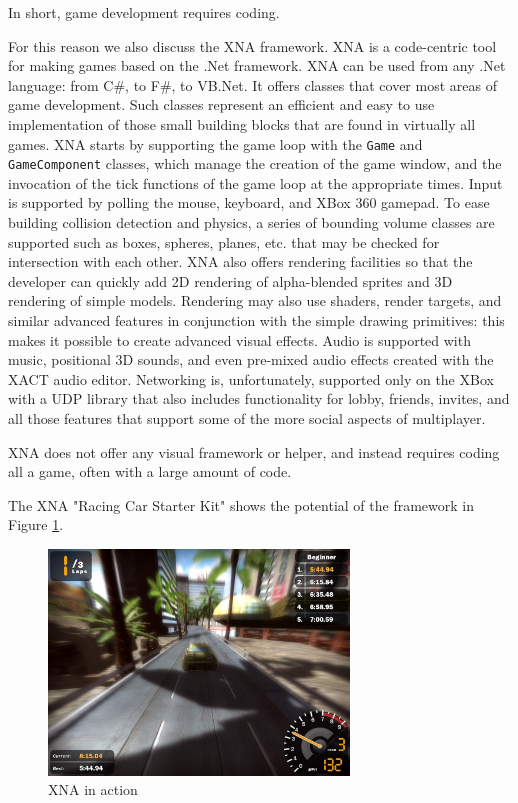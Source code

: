 In short, game development requires coding.

For this reason we also discuss the XNA framework. XNA is a code-centric tool for making games based on the .Net framework. XNA can be used from any .Net language: from C\#, to F\#, to VB.Net. It offers classes that cover most areas of game development. Such classes represent an efficient and easy to use implementation of those small building blocks that are found in virtually all games. XNA starts by supporting the game loop with the \texttt{Game} and \texttt{GameComponent} classes, which manage the creation of the game window, and the invocation of the tick functions of the game loop at the appropriate times. Input is supported by polling the mouse, keyboard, and XBox 360 gamepad. To ease building collision detection and physics, a series of bounding volume classes are supported such as boxes, spheres, planes, etc. that may be checked for intersection with each other. XNA also offers rendering facilities so that the developer can quickly add 2D rendering of alpha-blended sprites and 3D rendering of simple models. Rendering may also use shaders, render targets, and similar advanced features in conjunction with the simple drawing primitives: this makes it possible to create advanced visual effects. Audio is supported with music, positional 3D sounds, and even pre-mixed audio effects created with the XACT audio editor. Networking is, unfortunately, supported only on the XBox with a UDP library that also includes functionality for lobby, friends, invites, and all those features that support some of the more social aspects of multiplayer.

XNA does not offer any visual framework or helper, and instead requires coding all a game, often with a large amount of code.

The XNA "Racing Car Starter Kit" shows the potential of the framework in Figure \ref{fig:xna_in_action}.

\begin{figure}
\begin{center}
\includegraphics[width=8cm]{Pics/xna1.png}
\end{center}
\caption{XNA in action}
\label{fig:xna_in_action}
\end{figure}


